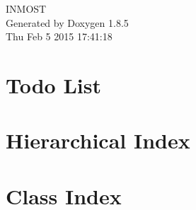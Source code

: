 \documentclass[twoside]{book}
\newcommand{\clearemptydoublepage}{%
  \newpage{\pagestyle{empty}\cleardoublepage}%
}
\begin{document}
\hypersetup{pageanchor=false}
\begin{titlepage}
\vspace*{7cm}
\begin{center}%
{\Large I\-N\-M\-O\-S\-T }\\
\vspace*{1cm}
{\large Generated by Doxygen 1.8.5}\\
\vspace*{0.5cm}
{\small Thu Feb 5 2015 17:41:18}\\
\end{center}
\end{titlepage}
\clearemptydoublepage
\tableofcontents
\clearemptydoublepage
{}
\hypersetup{pageanchor=true}

\chapter{Todo List}
\label{todo}
\hypertarget{todo}{}

\chapter{Hierarchical Index}

\chapter{Class Index}

\end{document}
